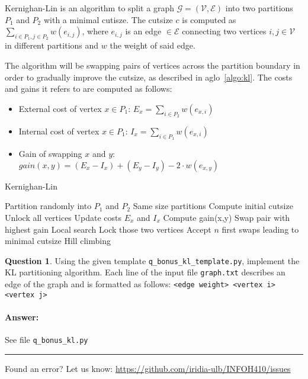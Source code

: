 \documentclass[11pt,a4paper]{article}
\theoremstyle{definition}%
\newtheorem{Q}{Question}[] %
\newcommand{\reponse}[1]{%
\ifthenelse {\boolean{corrige}} {\paragraph{Answer:} \color{darkblue}   #1\color{black}} {}
}
\begin{document}
Kernighan-Lin is an algorithm to split a graph $\mathcal{G} = (\mathcal{V}, \mathcal{E})$ into two partitions $P_1$ and $P_2$ with a minimal cutisze. The cutsize $c$ is computed as $\sum_{i \in P_1, j \in P_2} w(e_{i,j})$, where $e_{i,j}$ is an edge $\in \mathcal{E}$ connecting two vertices $i, j \in \mathcal{V}$ in different partitions and $w$ the weight of said edge.

The algorithm will be swapping pairs of vertices across the partition boundary in order to gradually improve the cutsize, as described in aglo~\ref{algo:kl}.
The costs and gains it refers to are computed as follows:
\begin{itemize}
    \item External cost of vertex $x \in P_1$: $E_x = \sum_{i\in P_2}w(e_{x,i})$
    \item Internal cost of vertex $x \in P_1$: $I_x = \sum_{i\in P_1}w(e_{x,i})$
    \item Gain of swapping $x$ and $y$: $gain(x,y) = (E_x - I_x) + (E_y - I_y) - 2\cdot w(e_{x,y})$
\end{itemize}

\begin{algorithm}
\caption{Kernighan-Lin}
\label{algo:kl}
\begin{algorithmic}[1]
    \State Partition randomly into $P_1$ and $P_2$
    \Comment Same size partitions
    \State Compute initial cutsize
    \Repeat
        \State Unlock all vertices
        \State Update costs $E_x$ and $I_x$
                    \State Compute gain(x,y)
                \EndFor
            \EndFor
            \State Swap pair with highest gain
            \Comment Local search
            \State Lock those two vertices
        \EndWhile
        \State Accept $n$ first swaps leading to minimal cutsize
        \Comment Hill climbing
\end{algorithmic}
\end{algorithm}

\begin{Q}
Using the given template \texttt{q\_bonus\_kl\_template.py}, implement the KL partitioning algorithm.
Each line of the input file \texttt{graph.txt} describes an edge of the graph and is formatted as follows: \texttt{<edge weight> <vertex i> <vertex j>}
\reponse{
    See file \texttt{q\_bonus\_kl.py}
}
\end{Q}


\noindent
\rule{\textwidth}{0.4pt}
\footnotesize{Found an error? Let us know: \url{https://github.com/iridia-ulb/INFOH410/issues}}
\end{document}
